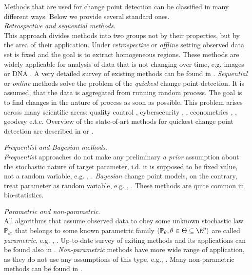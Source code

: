 \label{sec:survey}
Methods that are used for change point detection can be classified in many different ways. Below we provide several standard ones. \\
\textit{Retrospective and sequential methods}.\\
This approach divides methods into two groups not by their properties, but by the area of their application.  Under \textit{retrospective} or \textit{offline} setting observed data set is fixed and the goal is to extract homogeneous regions. These methods are widely applicable for analysis of data that is not changing over time, e.g. images or DNA \citet{RecombBaeysian}. A very detailed survey of existing methods can be found in \citet{ParStatChen}. \textit{Sequential} or \textit{online} methods solve the problem of the \textit{quickest} change point detection. It is assumed, that the data is aggregated from running random process. The goal is to find changes in the nature of process as soon as possible. This problem arises across many scientific areas: quality control \citet{QualContr1}, cybersecurity \citet{Cyber1}, \citet{Cyber2}, econometrics \citet{SpokoinyCP}, \citet{Econom2}, geodesy e.t.c. Overview of the state-of-art methods for quickest change point detection are described in \citet{ReviewPolun} or \citet{Shiryaev}. 

\textit{Frequentist and Bayesian methods}.\\
\textit{Frequentist} approaches do not make any preliminary \textit{a prior} assumption about the stochastic nature of target parameter, i.d. it is supposed to be fixed value, not a random variable, e.g. \citet{Freq1}, \citet{Freq2}.
\textit{Bayesian} change point models, on the contrary, treat parameter as random variable, e.g. \citet{Bayes1}, \citet{Bayes2}. These methods are quite common in bio-statistics.

\textit{Parametric and non-parametric}.\\
All algorithms that assume observed data to obey some unknown stochastic law $\mathbb{P}_{\theta}$, that belongs to some known parametric family $(\mathbb{P}_{\theta}, \theta \in \Theta \subseteq \R^p)$ are called \textit{parametric}, e.g. \citet{Param1}, \citet{Param2}. Up-to-date survey of exiting methods and its applications can be found also in \citet{ParStatChen}.
\textit{Non-parametric} methods have more wide range of application, as they do not use any assumptions of this type, e.g.\citet{NonParam1}, \citet{NonParam2}. Many non-parametric methods can be found in \citet{NonParamRev}.

